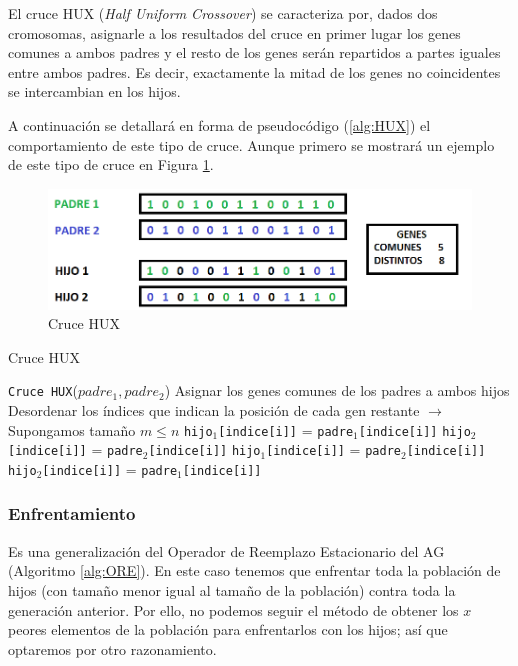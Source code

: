 El cruce HUX (\textit{Half Uniform Crossover}) se caracteriza por, dados dos cromosomas, asignarle a los resultados del cruce en primer lugar los genes comunes a ambos padres y el resto de los genes serán repartidos a partes iguales entre ambos padres. 
Es decir, exactamente la mitad de los genes no coincidentes se intercambian en los hijos. 

A continuación se detallará en forma de pseudocódigo (\ref{alg:HUX}) el comportamiento de este tipo de cruce. 
Aunque primero se mostrará un ejemplo de este tipo de cruce en Figura \ref{fig:HUX}.

\begin{figure}
		\centering
		\includegraphics[scale=0.5]{imagenes/CrossoverHUX.png}
        \caption{Cruce HUX}
        \label{fig:HUX}
\end{figure}

\begin{algorithm}
\caption{Cruce HUX}\label{alg:HUX}
\begin{algorithmic}[1]
\Procedure \texttt{Cruce HUX}($padre_1, padre_2$)
\State Asignar los genes comunes de los padres a ambos hijos
\State Desordenar los índices que indican la posición de cada gen restante $\xrightarrow{}{}$ Supongamos tamaño $m \leq n$
		\State \texttt{hijo$_1$[indice[i]]} = \texttt{padre$_1$[indice[i]]}
		\State \texttt{hijo$_2$[indice[i]]} = \texttt{padre$_2$[indice[i]]}
	\Else
		\State \texttt{hijo$_1$[indice[i]]} = \texttt{padre$_2$[indice[i]]}
		\State \texttt{hijo$_2$[indice[i]]} = \texttt{padre$_1$[indice[i]]}
	\EndIf
\EndFor
\EndProcedure
\end{algorithmic}
\end{algorithm}

\subsubsection{Enfrentamiento}

Es una generalización del Operador de Reemplazo Estacionario del AG (Algoritmo \ref{alg:ORE}). 
En este caso tenemos que enfrentar toda la población de hijos (con tamaño menor igual al tamaño de la población) contra toda la generación anterior. 
Por ello, no podemos seguir el método de obtener los $x$ peores elementos de la población para enfrentarlos con los hijos; así que optaremos por otro razonamiento. 

